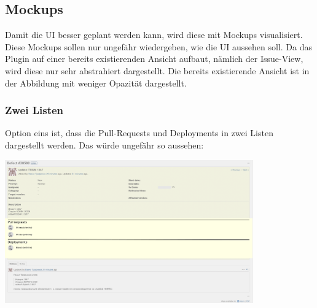 \begin{minipage}{\textwidth}
  \subsection{Mockups}
  \label{sec:mockups}
  Damit die UI besser geplant werden kann, wird diese mit Mockups visualisiert. Diese Mockups sollen
  nur ungefähr wiedergeben, wie die UI aussehen soll. Da das Plugin auf einer bereits existierenden 
  Ansicht aufbaut, nämlich der Issue-View, wird diese nur sehr abstrahiert dargestellt. \newline
  Die bereits existierende Ansicht ist in der Abbildung mit weniger Opazität dargestellt. \newline

  \begin{minipage}{\textwidth}
    \subsubsection{Zwei Listen}
    Option eins ist, dass die Pull-Requests und Deployments in zwei Listen dargestellt werden. Das würde ungefähr so
    aussehen: \newline
    \begin{center}
      \includegraphics[width=0.8\textwidth]{images/mockup/multiple-lists.png}
      \label{fig:mockup_multi_lists}
      \newline
    \end{center}
  \end{minipage}

  \begin{minipage}{\textwidth}

\end{minipage}
\end{minipage}
